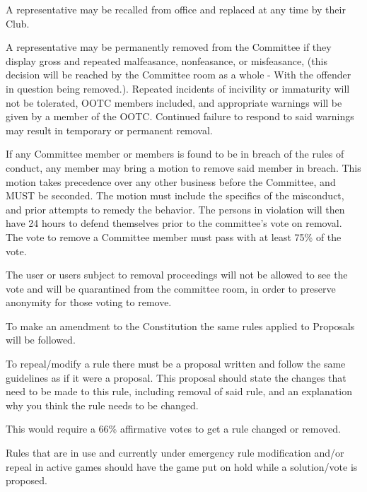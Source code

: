 \begin{deepEnumerate}
    \item A representative may be recalled from office and replaced at any time by their Club.
    \item A representative may be permanently removed from the Committee if they display gross and repeated malfeasance, nonfeasance, or misfeasance, 
    (this decision will be reached by the Committee room as a whole - With the offender in question being removed.). Repeated incidents of incivility or immaturity
     will not be tolerated, OOTC members included, and appropriate warnings will be given by a member of the OOTC. 
     Continued failure to respond to said warnings may result in temporary or permanent removal.
     \item If any Committee member or members is found to be in breach of the rules of conduct, any member may bring a motion to remove said member in breach. 
     This motion takes precedence over any other business before the Committee, and MUST be seconded. The motion must include the specifics of the misconduct, 
     and prior attempts to remedy the behavior. The persons in violation will then have 24 hours to defend themselves prior to the committee’s vote on removal. 
     The vote to remove a Committee member must pass with at least 75\% of the vote.
     \begin{deepEnumerate}
         \item The user or users subject to removal proceedings will not be allowed to see the vote and will be quarantined from the committee room, 
         in order to preserve anonymity for those voting to remove.
     \end{deepEnumerate}
\end{deepEnumerate}

\begin{deepEnumerate}
    \item To make an amendment to the Constitution the same rules applied to Proposals will be followed.
\end{deepEnumerate}

\begin{deepEnumerate}
    \item To repeal/modify a rule there must be a proposal written and follow the same guidelines as if it were a proposal. 
    This proposal should state the changes that need to be made to this rule, including removal of said rule, and an explanation why you think the rule needs to be changed.
    \begin{deepEnumerate}
        \item This would require a 66\% affirmative votes to get a rule changed or removed.
        \item Rules that are in use and currently under emergency rule modification and/or repeal in active games should have the game put on hold 
        while a solution/vote is proposed.
    \end{deepEnumerate}
\end{deepEnumerate}

